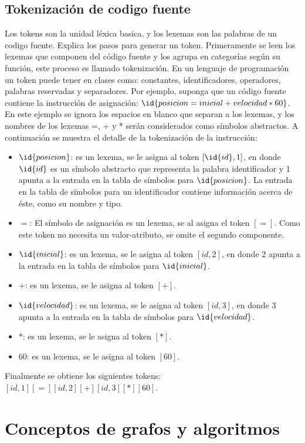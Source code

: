 \subsection{Tokenización de codigo fuente}
Los tokens son la unidad léxica basica, y los lexemas son las palabras de un codigo fuente. \cite{Aho2008} Explica los pasos para generar un token. Primeramente se leen los lexemas que componen del código fuente y los agrupa en categorías según su función, este proceso es llamado tokenización. En un lenguaje de programación un token puede tener en clases como: constantes, identificadores, operadores, palabras reservadas y separadores. Por ejemplo, suponga que un código fuente contiene la instrucción de asignación: $\id{posicion = inicial + velocidad * 60}$. En este ejemplo se ignora los espacios en blanco que separan a los lexemas, y los nombres de los lexemas =, + y * serán considerados como símbolos abstractos. A continuación se muestra el detalle de la tokenización de la instrucción:
\begin{itemize}
    \item $\id{posicion}$: es un lexema, se le asigna al token $[\id{id}, 1]$, en donde $\id{id}$ es un símbolo abstracto que representa la palabra identificador y 1 apunta a la entrada en la tabla de símbolos para $\id{posicion}$. La entrada en la tabla de símbolos para un identificador contiene información acerca de éste, como su nombre y tipo.
    \item $=$: El símbolo de asignación es un lexema, se al asigna el token $[=]$. Como este token no necesita un valor-atributo, se omite el segundo componente.
    \item $\id{inicial}$: es un lexema, se le asigna al token $[id, 2]$, en donde 2 apunta a la entrada en la tabla de símbolos para $\id{inicial}$.
    \item $+$: es un lexema, se le asigna al token $[+]$.
    \item $\id{velocidad}$: es un lexema, se le asigna al token $[id, 3]$, en donde 3 apunta a la entrada en la tabla de símbolos para $\id{velocidad}$.
    \item $*$: es un lexema, se le asigna al token $[*]$.
    \item $60$: es un lexema, se le asigna al token $[60]$.
\end{itemize}

\noindent Finalmente se obtiene los siguientes tokens: $[id, 1] [=] [id, 2] [+] [id, 3] [*] [60]$.

\section{Conceptos de grafos y algoritmos}
